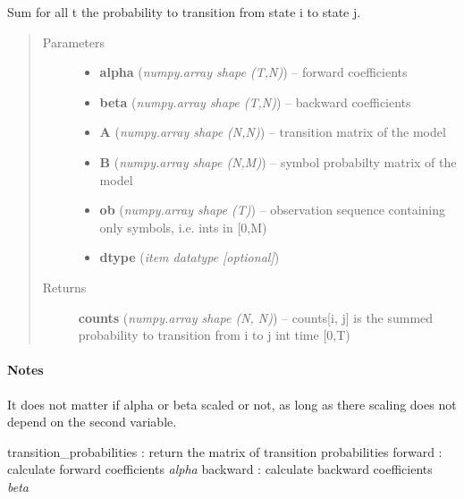 \documentclass[letterpaper,10pt,english]{sphinxmanual}
\begin{document}
\begin{fulllineitems}
\label{hmm:kernel.python.transition_counts}
Sum for all t the probability to transition from state i to state j.
\begin{quote}\begin{description}
\item[{Parameters}] \leavevmode\begin{itemize}
\item {} 
\textbf{alpha} (\emph{numpy.array shape (T,N)}) --
forward coefficients

\item {} 
\textbf{beta} (\emph{numpy.array shape (T,N)}) --
backward coefficients

\item {} 
\textbf{A} (\emph{numpy.array shape (N,N)}) --
transition matrix of the model

\item {} 
\textbf{B} (\emph{numpy.array shape (N,M)}) --
symbol probabilty matrix of the model

\item {} 
\textbf{ob} (\emph{numpy.array shape (T)}) --
observation sequence containing only symbols, i.e. ints in {[}0,M)

\item {} 
\textbf{dtype} (\emph{item datatype {[}optional{]}})

\end{itemize}

\item[{Returns}] \leavevmode
\textbf{counts} (\emph{numpy.array shape (N, N)}) --
counts{[}i, j{]} is the summed probability to transition from i to j
int time {[}0,T)

\end{description}\end{quote}
\paragraph{Notes}

It does not matter if alpha or beta scaled or not, as long as there scaling
does not depend on the second variable.




transition\_probabilities : return the matrix of transition probabilities
forward : calculate forward coefficients \emph{alpha}
backward : calculate backward coefficients \emph{beta}



\end{fulllineitems}
\end{document}
